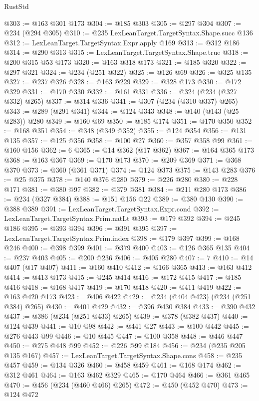 \begin{lexlean}{RustStd}
\begin{coremodule}
@303 := @163 @301 @173
@304 := @185 @303
@305 := @297 @304
@307 := @234 (@294 @305)
@310 := @235 LexLeanTarget.TargetSyntax.Shape.succ @136
@312 := LexLeanTarget.TargetSyntax.Expr.apply @169
@313 := @312 @186
@314 := @290 @313
@315 := LexLeanTarget.TargetSyntax.Shape.true
@318 := @200 @315 @53 @173
@320 := @163 @318 @173
@321 := @185 @320
@322 := @297 @321
@324 := @234 (@251 @322)
@325 := @126 @69
@326 := @325 @135
@327 := @237 @326
@328 := @163 @229
@329 := @328 @173
@330 := @172 @329
@331 := @170 @330
@332 := @161 @331
@336 := @324 (@234 (@327 @332) @265)
@337 := @314 @336
@341 := @307 (@234 (@310 @337) @265)
@343 := @289 (@291 @341)
@344 := @124 @343
@348 := @140 (@143 (@25 @283)) @280
@349 := @160 @69
@350 := @185 @174
@351 := @170 @350
@352 := @168 @351
@354 := @348 (@349 @352)
@355 := @124 @354
@356 := @131 @135
@357 := @125 @356
@358 := @100 @27
@360 := @357 @358 @99
@361 := @160 @156
@362 := 6
@365 := @14 @362 (@17 @362)
@367 := @164 @365 @173
@368 := @163 @367
@369 := @170 @173
@370 := @209 @369
@371 := @368 @370
@373 := @360 (@361 @371)
@374 := @124 @373
@375 := @143 @283
@376 := @25 @375
@378 := @140 @376 @280
@379 := @226 @280
@380 := @228 @171
@381 := @380 @97
@382 := @379 @381
@384 := @211 @280 @173
@386 := @234 (@327 @384)
@388 := @151 @156 @22
@389 := @380 @130
@390 := @388 @389
@391 := LexLeanTarget.TargetSyntax.Expr.cond
@392 := LexLeanTarget.TargetSyntax.Prim.natLt
@393 := @179 @392
@394 := @245 @186
@395 := @393 @394
@396 := @391 @395
@397 := LexLeanTarget.TargetSyntax.Prim.index
@398 := @179 @397
@399 := @168 @246
@400 := @398 @399
@401 := @379 @400
@403 := @126 @365 @135
@404 := @237 @403
@405 := @200 @236
@406 := @405 @280
@407 := 7
@410 := @14 @407 (@17 @407)
@411 := @160 @410
@412 := @166 @365
@413 := @163 @412
@414 := @413 @173
@415 := @245 @414
@416 := @172 @415
@417 := @185 @416
@418 := @168 @417
@419 := @170 @418
@420 := @411 @419
@422 := @163 @420 @173
@423 := @406 @422
@429 := @234 (@404 @423) (@234 (@251 @384) @265)
@430 := @401 @429
@432 := @396 @430 @384
@433 := @390 @432
@437 := @386 (@234 (@251 @433) @265)
@439 := @378 (@382 @437)
@440 := @124 @439
@441 := @10 @98
@442 := @441 @27
@443 := @100 @442
@445 := @276 @443 @99
@446 := @10 @445
@447 := @100 @358
@448 := @446 @447
@450 := @275 @448 @99
@452 := @226 @99 @184
@456 := @234 (@235 @205 @135 @167)
@457 := LexLeanTarget.TargetSyntax.Shape.cons
@458 := @235 @457
@459 := @134 @326
@460 := @458 @459
@461 := @168 @174
@462 := @312 @461
@464 := @163 @462 @329
@465 := @170 @464
@466 := @361 @465
@470 := @456 (@234 (@460 @466) @265)
@472 := @450 (@452 @470)
@473 := @124 @472

\end{coremodule}
\end{lexlean}
